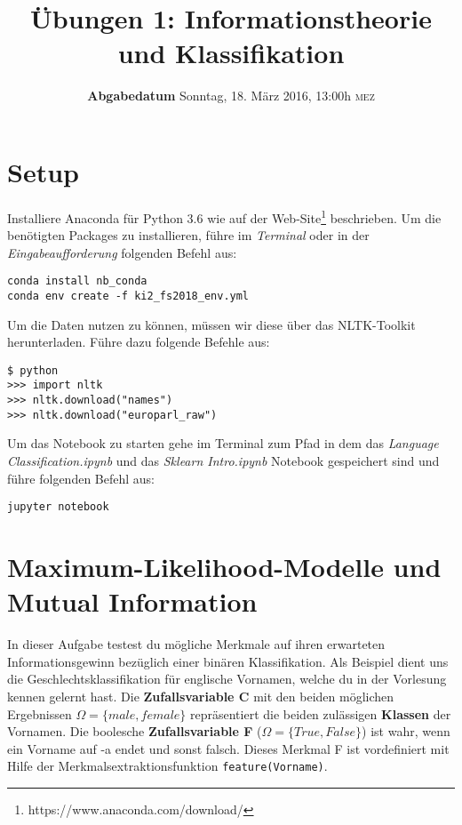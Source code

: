 \documentclass[a4paper,10pt]{article}
\title{Übungen 1: Informationstheorie und  Klassifikation}
\date{\textbf{Abgabedatum} Sonntag, 18. März 2016, 13:00h \textsc{mez}
}
\newcommand{\punkte}[1]{(\emph{#1 p})}
\begin{document}
\maketitle

\section*{Setup}
Installiere Anaconda für Python 3.6 wie auf der Web-Site\footnote{https://www.anaconda.com/download/} beschrieben. Um die benötigten Packages zu installieren, führe im \emph{Terminal} oder in der \emph{Eingabeaufforderung} folgenden Befehl aus: 
\begin{lstlisting}[keepspaces=true,basicstyle=\ttfamily\footnotesize,language={}]
conda install nb_conda
conda env create -f ki2_fs2018_env.yml
\end{lstlisting}
Um die Daten nutzen zu können, müssen wir diese über das NLTK-Toolkit herunterladen. Führe dazu folgende Befehle aus:
\begin{lstlisting}[keepspaces=true,basicstyle=\ttfamily\footnotesize,language={}]
$ python
>>> import nltk
>>> nltk.download("names")
>>> nltk.download("europarl_raw")
\end{lstlisting}
Um das Notebook zu starten gehe im Terminal zum Pfad in dem das \emph{Language Classification.ipynb} und das \emph{Sklearn Intro.ipynb} Notebook gespeichert sind und führe folgenden Befehl aus:
\begin{lstlisting}[keepspaces=true,basicstyle=\ttfamily\footnotesize,language={}]
jupyter notebook
\end{lstlisting}

\section{Maximum-Likelihood-Modelle und Mutual Information}
In dieser Aufgabe testest du mögliche Merkmale auf ihren erwarteten Informationsgewinn bezüglich einer binären Klassifikation.
Als Beispiel dient uns die Geschlechtsklassifikation für englische Vornamen, welche du in der Vorlesung kennen gelernt hast. 
Die \textbf{Zufallsvariable C} mit den beiden möglichen Ergebnissen $\Omega =\{male,female\}$ repräsentiert die beiden zulässigen \textbf{Klassen} der Vornamen.
Die boolesche \textbf{Zufallsvariable F} ($\Omega = \{True,False\}$) ist wahr, wenn ein Vorname auf -a endet und sonst falsch. Dieses Merkmal F ist vordefiniert mit Hilfe der Merkmalsextraktionsfunktion \lstinline!feature(Vorname)!. 
\end{document}
